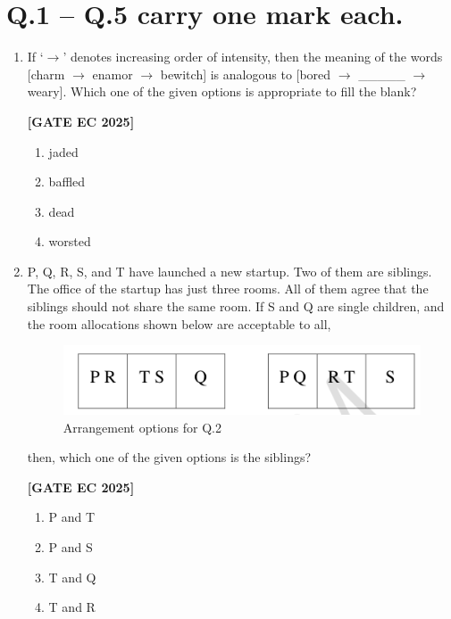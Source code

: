 \documentclass[12pt]{article}
\begin{document}
\section*{Q.1 -- Q.5 carry one mark each.}

\begin{enumerate}[leftmargin=1.5em, label=\textbf{Q.\arabic*}., itemsep=2em]

\item If ‘$\to$’ denotes increasing order of intensity, then the meaning of the words 
[charm $\to$ enamor $\to$ bewitch] is analogous to [bored $\to$ \_\_\_\_\_ $\to$ weary].  
Which one of the given options is appropriate to fill the blank?

\noindent \textbf{[GATE EC 2025]}
\begin{multicols}{2}
\begin{enumerate}
    \item jaded
    \item baffled
    \item dead
    \item worsted
\end{enumerate}
\end{multicols}

\item P, Q, R, S, and T have launched a new startup. Two of them are siblings. The office of the startup has just three rooms. All of them agree that the siblings should not share the same room.  
If S and Q are single children, and the room allocations shown below are acceptable to all,
\begin{figure}[H]\centering
\includegraphics[width=0.5\columnwidth]{figs/q2.png}
\caption{Arrangement options for Q.2}
\label{fig:q2}
\end{figure}then, which one of the given options is the siblings?

\noindent \textbf{[GATE EC 2025]}
\begin{multicols}{2}
\begin{enumerate}
    \item P and T
    \item P and S
    \item T and Q
    \item T and R
\end{enumerate}
\end{multicols}


\end{enumerate}
\end{document}
